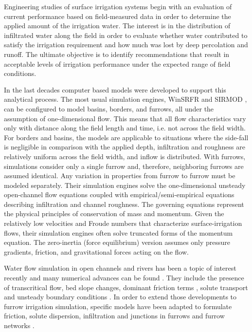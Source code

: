 \documentclass[review,authoryear]{elsarticle}
\begin{document}
Engineering studies of surface irrigation systems begin with an evaluation of
current performance based on field-measured data in order to determine the
applied amount of the irrigation water. The interest is in the distribution of
infiltrated water along the field in order to evaluate whether water contributed
to satisfy the irrigation requirement and how much was lost by deep percolation
and runoff. The ultimate objective is to identify recommendations that result in
acceptable levels of irrigation performance under the expected range of field
conditions.

In the last decades computer based models were developed to support this
analytical process. The most usual simulation engines, WinSRFR
\citep{Clemmens99} and SIRMOD \citep{Walker03}, can be configured to model
basins, borders, and furrows, all under the assumption of one-dimensional flow.
This means that all flow characteristics vary only with distance along the field
length and time, i.e. not across the field width. For borders and basins, the
models are applicable to situations where the side-fall is negligible in
comparison with the applied depth, infiltration and roughness are relatively
uniform across the field width, and inflow is distributed. With furrows,
simulations consider only a single furrow and, therefore, neighboring furrows
are assumed identical. Any variation in properties from furrow to furrow must be
modeled separately. Their simulation engines solve the one-dimensional unsteady
open-channel flow equations coupled with empirical/semi-empirical equations
describing infiltration and channel roughness. The governing equations represent
the physical principles of conservation of mass and momentum. Given the
relatively low velocities and Froude numbers that characterize
surface-irrigation flows, their simulation engines often solve truncated forms
of the momentum equation. The zero-inertia (force equilibrium) version assumes
only pressure gradients, friction, and gravitational forces acting on the flow. 

Water flow simulation in open channels and rivers has been a topic of interest
recently and many numerical advances can be found \citep{JaviTVD}. They include
the presence of transcritical flow, bed slope changes, dominant friction terms
\citep{JaviFriccion,JaviFriccion2}, solute transport \citep{JaviTrans} and
unsteady boundary conditions \citep{JaviContorno}. In order to extend those
developments to furrow irrigation simulation, specific models have been adapted
to formulate friction, solute dispersion, infiltration and junctions in furrows
and furrow networks \citep{JaviSurcos1,JaviSurcos2}.
\end{document}
